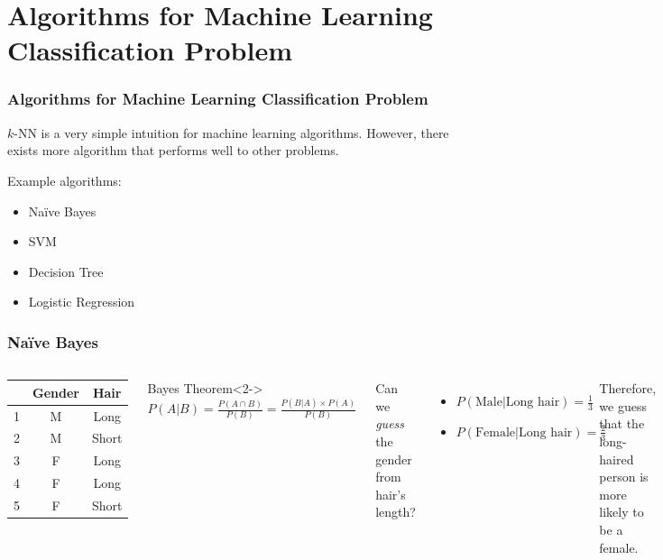 \documentclass[aspectratio=169]{beamer}
\begin{document}
\section{Algorithms for Machine Learning Classification Problem}

\begin{frame}
	\frametitle{Algorithms for Machine Learning Classification Problem}
	 $k$-NN is a very simple intuition for machine learning algorithms. However, there exists more algorithm that performs well to other problems.

	 Example algorithms:
	\begin{itemize}
		\item<4-> Na\"{i}ve Bayes
		\item<5-> SVM
		\item<6-> Decision Tree
		\item<7-> Logistic Regression
	\end{itemize}
\end{frame}

\begin{frame}
	\frametitle{Na\"ive Bayes}
	\begin{columns}
		\begin{center}
			\begin{tabular}{|c | c c |}
				\hline
				  & Gender & Hair  \\ [0.5ex]
				\hline\hline
				1 & M      & Long  \\
				\hline
				2 & M      & Short \\
				\hline
				3 & F      & Long  \\
				\hline
				4 & F      & Long  \\
				\hline
				5 & F      & Short \\ [1ex]
				\hline
			\end{tabular}
		\end{center}
		\begin{block}{Bayes Theorem}<2->
			$P(A|B) = \frac{P(A \cap B)}{P(B)} = \frac{P(B|A) \times P(A)}{P(B)}$
		\end{block}
		Can we \textit{guess} the gender from hair's length?
		\begin{itemize}
			\item<4-> $P(\textrm{Male}|\textrm{Long hair}) = \frac{1}{3}$
			\item<5-> $P(\textrm{Female}|\textrm{Long hair}) = \frac{2}{3}$
		\end{itemize}
		 Therefore, we guess that the long-haired person is more likely to be a female.
	\end{columns}
\end{frame}
\end{document}
